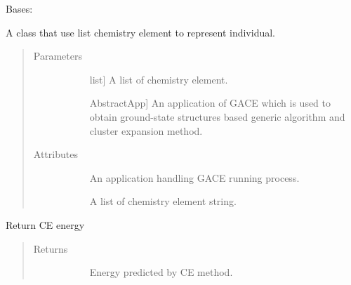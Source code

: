 \documentclass[letterpaper,10pt,english]{sphinxmanual}
\begin{document}
\begin{fulllineitems}
\label{\detokenize{pygace.examples.hfo2:pygace.examples.hfo2.hfo2_gace.HfO2EleIndv}}
Bases: {\hyperref[\detokenize{pygace:pygace.utility.EleIndv}]{}}

A class that use list chemistry element to represent individual.
\begin{quote}\begin{description}
\item[{Parameters}] \leavevmode\begin{description}
\item[{}] \leavevmode{[}list{]}
A list of chemistry element.

\item[{}] \leavevmode{[}AbstractApp{]}
An application of GACE which is used to obtain ground-state
structures based generic algorithm and cluster expansion method.

\end{description}

\item[{Attributes}] \leavevmode\begin{description}
\item[{}] \leavevmode
An application handling GACE running process.

\item[{}] \leavevmode
A list of chemistry element string.

\end{description}

\end{description}\end{quote}

\begin{fulllineitems}
\label{\detokenize{pygace.examples.hfo2:pygace.examples.hfo2.hfo2_gace.HfO2EleIndv.ce_energy}}
Return CE energy
\begin{quote}\begin{description}
\item[{Returns}] \leavevmode\begin{description}
\item[{}] \leavevmode
Energy predicted by CE method.


\end{description}
\end{description}
\end{quote}
\end{fulllineitems}
\end{fulllineitems}
\end{document}
